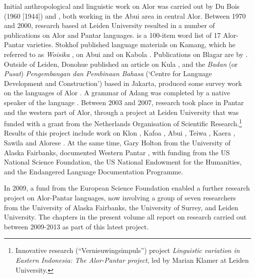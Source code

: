 Initial anthropological and linguistic work on Alor was carried out by Du Bois (1960 [1944]) and \citet{Nicolspeyer1940}, both working in the Abui area in central Alor. Between 1970 and 2000, research based at Leiden University resulted in a number of publications on Alor and Pantar languages. \citet{Stokhof1975} is a 100-item word list of 17 Alor-Pantar varieties. Stokhof published language materials on Kamang, which he referred to as \textit{Woisika} \citep{Stokhof1977,Stokhof1978,Stokhof1979,Stokhof1982,Stokhof1983}, on Abui \citep{Stokhof1984} and on Kabola \citep{Stokhof1987}. Publications on Blagar are by \citet{Steinhauer1977,Steinhauer1991,Steinhauer1993,Steinhauer1995,Steinhauer1999,Steinhauer2010,Steinhauer2012,Steinhauerta}. 
Outside of Leiden, Donohue published an article on Kula \citep{Donohue1996}, and the \textit{Badan} (or \textit{Pusat}) \textit{Pengembangan dan Pembinaan Bahasa} (`Centre for Language Development and Construction') based in Jakarta, produced some survey work on the languages of Alor \citep{MartisEtAl2000}. A grammar of Adang was completed by a native speaker of the language \citep{Haan2001}. 
Between 2003 and 2007, research took place in Pantar and the western part of Alor, through a project at Leiden University that was funded with a grant from the Netherlands Organisation of Scientific Research.\footnote{Innovative research (``Vernieuwingsimpuls'') project \textit{Linguistic variation in Eastern Indonesia: The Alor-Pantar project}, led by Marian Klamer at Leiden University.} Results of this project include work on 
Klon \citep{Baird2005,Baird2008,Baird2010},
Kafoa \citep{Bairdta},
Abui \citep{Kratochvil2007,KratochvilEtAl2008kamus,KratochvilEtAl2008netanga,KlamerEtAl2006,KlamerEtAl2010nusantara,Kratochvil2011discourse,Kratochvil2011transitivity},
Teiwa \citep{Klamer2010grammar,Klamer2010ditransitive,Klamer2010item,KlamerEtAl2006,Klamer2011,Klamer2012},
Kaera \citep{Klamer2010ditransitive,Klamertanumeral}, 
Sawila \citep{Kratochvilta} and 
Alorese \citep{Klamer2011,Klamer2012}. 
At the same time, Gary Holton from the University of Alaska Fairbanks, documented 
Western Pantar \citep{Holton2008,Holton2010person,Holton2011,HoltonEtAl2008,Holtontanumeral,Holtontawesternpantar}, with funding from the US National Science Foundation, the US National Endowment for the Humanities, and the Endangered Language Documentation Programme.

In 2009, a fund from the European Science Foundation enabled a further research project on Alor-Pantar languages, now involving a group of seven researchers from the University of Alaska Fairbanks, the University of Surrey, and Leiden University. The chapters in the present volume all report on research carried out between 2009-2013 as part of this latest project.

